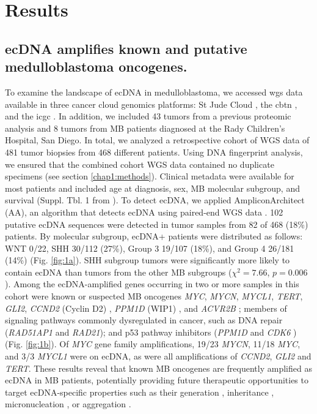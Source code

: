 \section{Results}

\subsection{ecDNA amplifies known and putative medulloblastoma oncogenes.}
To examine the landscape of ecDNA in medulloblastoma, we accessed \acrshort{wgs} data available in three cancer cloud genomics platforms: St Jude Cloud \cite{stjude}, the \acrfull{cbtn} \cite{cbtn}, and the \acrfull{icgc} \cite{pcawg}. In addition, we included 43 tumors from a previous proteomic analysis \cite{archer_2017} and 8 tumors from MB patients diagnosed at the Rady Children's Hospital, San Diego. In total, we analyzed a retrospective cohort of WGS data of 481 tumor biopsies from 468 different patients. Using DNA fingerprint analysis, we ensured that the combined cohort WGS data contained no duplicate specimens (see section \ref{chap1:methods}). Clinical metadata were available for most patients and included age at diagnosis, sex, MB molecular subgroup, and survival (Suppl. Tbl. 1 from \cite{Chapman}). To detect ecDNA, we applied AmpliconArchitect (AA), an algorithm that detects ecDNA using paired-end WGS data \cite{AA}. 102 putative ecDNA sequences were detected in tumor samples from 82 of 468 (18\%) patients. By molecular subgroup, ecDNA+ patients were distributed as follows: WNT 0/22, SHH 30/112 (27\%), Group 3 19/107 (18\%), and Group 4 26/181 (14\%) (Fig. \ref{fig:1a}). SHH subgroup tumors were significantly more likely to contain ecDNA than tumors from the other MB subgroups ($\chi^2=7.66$, $p=0.006$). Among the ecDNA-amplified genes occurring in two or more samples in this cohort were known or suspected MB oncogenes \textit{MYC}, \textit{MYCN}, \textit{MYCL1}, \textit{TERT}, \textit{GLI2}, \textit{CCND2} (Cyclin D2) \cite{garancher_2018}, \textit{PPM1D} (WIP1) \cite{Wen_2016}, and \textit{ACVR2B} \cite{morabito_2019}; members of signaling pathways commonly dysregulated in cancer, such as DNA repair (\textit{RAD51AP1} and \textit{RAD21}); and p53 pathway inhibitors (\textit{PPM1D} \cite{lu_2008} and \textit{CDK6} \cite{bellutti_2018}) (Fig. \ref{fig:1b}). Of \textit{MYC} gene family amplifications, 19/23 \textit{MYCN}, 11/18 \textit{MYC}, and 3/3 \textit{MYCL1} were on ecDNA, as were all amplifications of \textit{CCND2}, \textit{GLI2} and \textit{TERT}. These results reveal that known MB oncogenes are frequently amplified as ecDNA in MB patients, potentially providing future therapeutic opportunities to target ecDNA-specific properties such as their generation \cite{shoshani_2020}, inheritance \cite{Lange_2021}, micronucleation \cite{shimizu_1998}, or aggregation \cite{van_leen_2022,hung_2021}.

